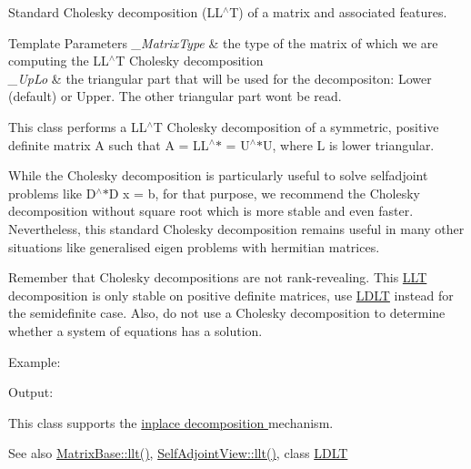 Standard Cholesky decomposition (L\+L$^\wedge$T) of a matrix and associated features. 


\begin{DoxyTemplParams}{Template Parameters}
{\em \+\_\+\+Matrix\+Type} & the type of the matrix of which we are computing the L\+L$^\wedge$T Cholesky decomposition \\
\hline
{\em \+\_\+\+Up\+Lo} & the triangular part that will be used for the decompositon\+: Lower (default) or Upper. The other triangular part won\textquotesingle{}t be read.\\
\hline
\end{DoxyTemplParams}
This class performs a L\+L$^\wedge$T Cholesky decomposition of a symmetric, positive definite matrix A such that A = L\+L$^\wedge$$\ast$ = U$^\wedge$$\ast$U, where L is lower triangular.

While the Cholesky decomposition is particularly useful to solve selfadjoint problems like D$^\wedge$$\ast$D x = b, for that purpose, we recommend the Cholesky decomposition without square root which is more stable and even faster. Nevertheless, this standard Cholesky decomposition remains useful in many other situations like generalised eigen problems with hermitian matrices.

Remember that Cholesky decompositions are not rank-\/revealing. This \hyperlink{group___cholesky___module_class_eigen_1_1_l_l_t}{L\+LT} decomposition is only stable on positive definite matrices, use \hyperlink{group___cholesky___module_class_eigen_1_1_l_d_l_t}{L\+D\+LT} instead for the semidefinite case. Also, do not use a Cholesky decomposition to determine whether a system of equations has a solution.

Example\+: 
\begin{DoxyCodeInclude}
\end{DoxyCodeInclude}
 Output\+: 
\begin{DoxyVerbInclude}
\end{DoxyVerbInclude}


This class supports the \hyperlink{group___inplace_decomposition}{inplace decomposition } mechanism.

\begin{DoxySeeAlso}{See also}
\hyperlink{group___core___module_a90c45f7a30265df792d5aeaddead2635}{Matrix\+Base\+::llt()}, \hyperlink{group___core___module_a405e810491642a7f7b785f2ad6f93619}{Self\+Adjoint\+View\+::llt()}, class \hyperlink{group___cholesky___module_class_eigen_1_1_l_d_l_t}{L\+D\+LT} 
\end{DoxySeeAlso}


